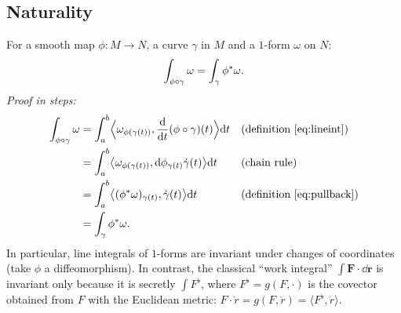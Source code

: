 \subsection{Naturality}\label{sec:naturality}

For a smooth map $\phi:M\to N$, a curve $\gamma$ in $M$ and a $1$-form $\omega$ on $N$:
\begin{equation}\label{eq:natural}
\int_{\phi\circ\gamma}\omega=\int_\gamma\phi\pb\omega .
\end{equation}
\emph{Proof in steps:}
\begin{align*}
\int_{\phi\circ\gamma}\omega&=\int_a^b\Bigl\langle\omega_{\phi(\gamma(t))},\frac{\mathrm{d}}{\mathrm{d} t}(\phi\circ\gamma)(t)\Bigr\rangle\mathrm{d} t &&\text{(definition \eqref{eq:lineint})}\\
&=\int_a^b\bigl\langle\omega_{\phi(\gamma(t))},\mathrm{d}\phi_{\gamma(t)}\dot\gamma(t)\bigr\rangle\mathrm{d} t &&\text{(chain rule)}\\
&=\int_a^b\bigl\langle(\phi{}^{*}\omega)_{\gamma(t)},\dot\gamma(t)\bigr\rangle\mathrm{d} t &&\text{(definition \eqref{eq:pullback})}\\
&=\int_\gamma\phi{}^{*}\omega .
\end{align*}
In particular, line integrals of $1$-forms are invariant under changes of coordinates (take $\phi$ a diffeomorphism). In contrast, the classical ``work integral'' $\int\mathbf F\cdot\dd\mathbf r$ is invariant only because it is secretly $\int F^\flat$, where $F^\flat=g(F,\cdot)$ is the covector obtained from $F$ with the Euclidean metric: $F\cdot\dot r=g(F,\dot r)=\langle F^\flat,\dot r\rangle$.
